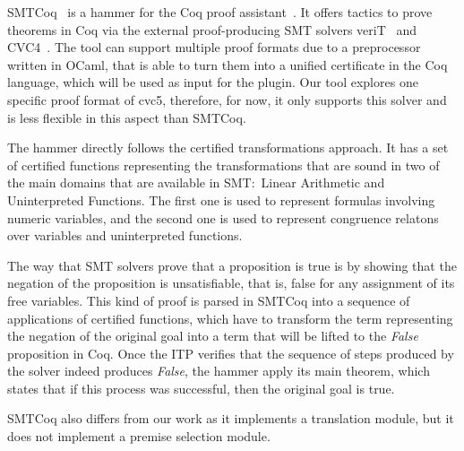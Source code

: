SMTCoq~\cite{smtcoq} is a hammer for the Coq proof assistant~\cite{Bertot2004}.
It offers tactics to prove theorems in Coq via the external proof-producing SMT
solvers veriT~\cite{Bouton2009} and CVC4~\cite{Barrett2011}. The tool can support multiple proof formats
due to a preprocessor written in OCaml, that is able to turn them
into a unified certificate in the Coq language,
which will be used as input for the plugin. Our tool explores one specific
proof format of cvc5, therefore, for now, it only supports this solver and is
less flexible in this aspect than SMTCoq.

The hammer directly follows the certified transformations approach.
It has a set of certified functions representing the transformations
that are sound in two of the main domains that are available in SMT:\
Linear Arithmetic and Uninterpreted Functions. The first one is used to
represent formulas involving numeric variables, and the second one is
used to represent congruence relatons over variables and uninterpreted functions.

The way that SMT solvers prove
that a proposition is true is by showing that the negation of the proposition is unsatisfiable,
that is, false for any assignment of its free variables. This kind of proof
is parsed in SMTCoq into a sequence of applications of certified functions, which have
to transform the term representing the negation of the original goal into a
term that will be lifted to the \textit{False} proposition in Coq. Once the
ITP verifies that the sequence of steps produced by the solver indeed
produces \textit{False}, the hammer apply its main theorem, which states that if
this process was successful, then the original goal is true.

SMTCoq also differs from our work as it implements a translation module, but
it does not implement a premise selection module.
